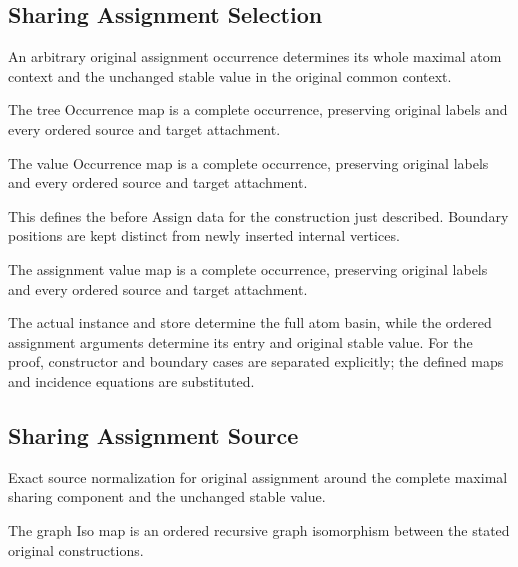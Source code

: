 \subsection{Sharing Assignment Selection}
An arbitrary original assignment occurrence determines its whole maximal atom context and the unchanged stable value in the original common context.

The tree Occurrence map is a complete occurrence, preserving original labels and every ordered source and target attachment.
\par{}

The value Occurrence map is a complete occurrence, preserving original labels and every ordered source and target attachment.
\par{}

This defines the before Assign data for the construction just described. Boundary positions are kept distinct from newly inserted internal vertices.
\par{}

The assignment value map is a complete occurrence, preserving original labels and every ordered source and target attachment.
\par{}

The actual instance and store determine the full atom basin, while the ordered assignment arguments determine its entry and original stable value.
For the proof, constructor and boundary cases are separated explicitly; the defined maps and incidence equations are substituted.
\par{}

\subsection{Sharing Assignment Source}
Exact source normalization for original assignment around the complete maximal sharing component and the unchanged stable value.

The graph Iso map is an ordered recursive graph isomorphism between the stated original constructions.
\par{}

